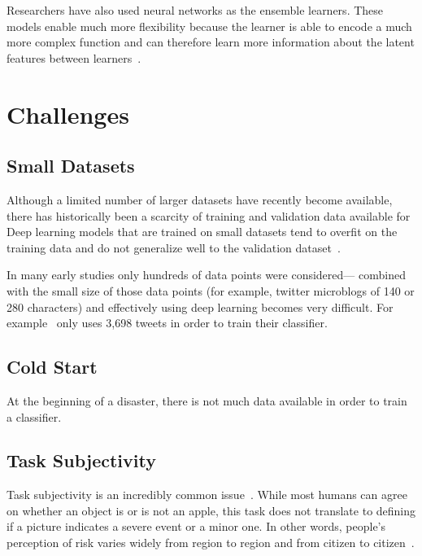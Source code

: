   Researchers have also used neural networks as the ensemble learners. These models enable
  much more flexibility because the learner is able to encode a much more complex
  function and can therefore learn more information about the
  latent features between learners~\cite{jordanHierarchicalMixturesExperts1994}.

\section{Challenges}

\subsection{Small Datasets}
Although a limited number of larger datasets have recently become available, there has
historically been a scarcity of training and validation data available for
Deep learning models that are trained on small datasets tend to overfit on the
training data and do not generalize well to the validation
dataset~\cite{perezEffectivenessDataAugmentation2017,nguyenRapidClassificationCrisisRelated}.

In many early studies only hundreds of data points were considered--- combined
with the small size of those data points (for example, twitter microblogs of
140 or 280 characters) and effectively using deep learning becomes very
difficult. For example~\cite{nagyCrowdSentimentDetection2012} only uses 3,698 tweets in
order to train their classifier.
\subsection{Cold Start}

At the beginning of a disaster, there is not much data available in order to
train a classifier.

\subsection{Task Subjectivity}
Task subjectivity is an incredibly common
issue~\cite{nguyenDamageAssessmentSocial2017,
quarantelliUrbanVulnerabilityDisasters2003}. While most humans can agree on
whether an object is or is not an apple, this task does not translate to
defining if a picture indicates a severe event or a minor one. 
In other words, people's perception of risk varies widely from region to region
and from citizen to citizen~\cite{quarantelliUrbanVulnerabilityDisasters2003}.


